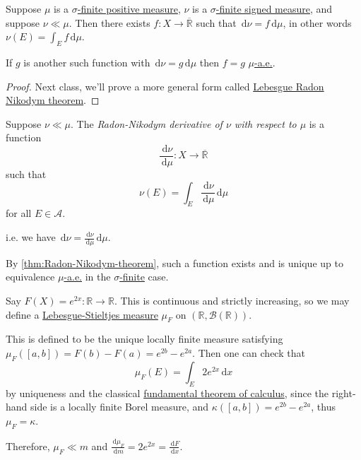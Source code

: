 \begin{theorem}\label{thm:Radon-Nikodym-theorem}
	Suppose \(\mu\) is a \hyperref[def:finite-signed-measure]{\(\sigma\)-finite positive measure}, \(\nu\) is a \hyperref[def:finite-signed-measure]{\(\sigma\)-finite signed measure},
	and suppose \(\nu \ll \mu\). Then there exists \(f \colon X \to \overline{\mathbb{R}}\) such that \(\,\mathrm{d} \nu = f \,\mathrm{d} \mu\), in other words \(\nu(E) = \int_E f \,\mathrm{d} \mu\).

	If \(g\) is another such function with \(\,\mathrm{d} \nu = g \,\mathrm{d} \mu\) then \(f = g\) \hyperref[def:mu-almost-everywhere]{\(\mu\)-a.e.}.
\end{theorem}
\begin{proof}
	Next class, we'll prove a more general form called \hyperref[thm:Lebesgue-Radon-Nikodym-theorem]{Lebesgue Radon Nikodym theorem}.
\end{proof}

\begin{definition}\label{def:Radon-Nikodym-derivative}
	Suppose \(\nu \ll \mu\). The \emph{Radon-Nikodym derivative of \(\nu\) with respect to \(\mu\)} is a function
	\[
		\frac{\,\mathrm{d} \nu}{\,\mathrm{d} \mu} \colon X \to \overline{\mathbb{R}}
	\]
	such that
	\[
		\nu(E) = \int_E \frac{\,\mathrm{d} \nu}{\,\mathrm{d} \mu} \,\mathrm{d} \mu
	\]
	for all \(E \in \mathcal{A}\).
\end{definition}
\begin{remark}
	i.e. we have \(\,\mathrm{d} \nu = \frac{\,\mathrm{d} \nu}{\,\mathrm{d} \mu} \,\mathrm{d} \mu\).
\end{remark}
\begin{note}
	By \autoref{thm:Radon-Nikodym-theorem}, such a function exists and is unique up to equivalence \hyperref[def:mu-almost-everywhere]{\(\mu\)-a.e.}
	in the \hyperref[def:finite-signed-measure]{\(\sigma\)-finite} case.
\end{note}
\begin{eg}
	Say \(F(X) = e^{2x} \colon \mathbb{R} \to \mathbb{R}\). This is continuous and strictly increasing, so we may define a \hyperref[def:Lebesgue-Stieltjes-measure]{Lebesgue-Stieltjes measure}
	\(\mu_F\) on \((\mathbb{R}, \mathcal{B}(\mathbb{R}))\).

	This is defined to be the unique locally finite measure satisfying \(\mu_F([a,b]) = F(b) - F(a) = e^{2b} - e^{2a}\). Then one can check that
	\[
		\mu_F(E) = \int_E 2e^{2x} \,\mathrm{d} x
	\]
	by uniqueness and the classical \underline{fundamental theorem of calculus}, since the right-hand side is a locally finite Borel measure, and
	\(\kappa([a,b]) = e^{2b} - e^{2a}\), thus \(\mu_F = \kappa\).

	Therefore, \(\mu_F \ll m\) and \(\frac{\,\mathrm{d} \mu_F}{\,\mathrm{d} m} = 2e^{2x} = \frac{\,\mathrm{d} F}{\,\mathrm{d} x}\).
\end{eg}

